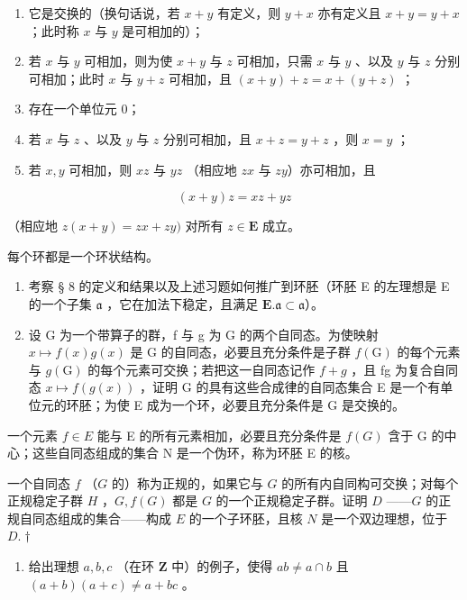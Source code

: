 \begin{enumerate}
\def\labelenumi{(\arabic{enumi})}
\item
  它是交换的（换句话说，若 \(x + y\) 有定义，则 \(y + x\) 亦有定义且 \(x + y = y + x\) ；此时称 \(x\) 与 \(y\) 是可相加的）；
\item
  若 \(x\) 与 \(y\) 可相加，则为使 \(x + y\) 与 \(z\) 可相加，只需 \(x\) 与 \(y\) 、以及 \(y\) 与 \(z\) 分别可相加；此时 \(x\) 与 \(y + z\) 可相加，且 \((x + y) + z = x + (y + z)\) ；
\item
  存在一个单位元 0；
\item
  若 \(x\) 与 \(z\) 、以及 \(y\) 与 \(z\) 分别可相加，且 \(x + z = y + z\) ，则 \(x = y\) ；
\item
  若 \(x, y\) 可相加，则 \(xz\) 与 \(yz\) （相应地 \(zx\) 与 \(zy\)）亦可相加，且
\end{enumerate}

\[
(x + y) z = x z + y z
\]

（相应地 \(z(x + y) = zx + zy)\) 对所有 \(z \in \mathbf{E}\) 成立。

每个环都是一个环状结构。

\begin{enumerate}
\def\labelenumi{(\alph{enumi})}
\item
  考察 § 8 的定义和结果以及上述习题如何推广到环胚（环胚 E 的左理想是 E 的一个子集 \(\mathfrak{a}\) ，它在加法下稳定，且满足 \(\mathbf{E}.\mathfrak{a}\subset \mathfrak{a}\)）。
\item
  设 G 为一个带算子的群，f 与 g 为 G 的两个自同态。为使映射 \(x \mapsto f(x)g(x)\) 是 G 的自同态，必要且充分条件是子群 \(f(\mathrm{G})\) 的每个元素与 \(g(\mathrm{G})\) 的每个元素可交换；若把这一自同态记作 \(f + g\) ，且 fg 为复合自同态 \(x \mapsto f(g(x))\) ，证明 G 的具有这些合成律的自同态集合 E 是一个有单位元的环胚；为使 E 成为一个环，必要且充分条件是 G 是交换的。
\end{enumerate}

一个元素 \(f \in E\) 能与 E 的所有元素相加，必要且充分条件是 \(f(G)\) 含于 G 的中心；这些自同态组成的集合 N 是一个伪环，称为环胚 E 的核。

一个自同态 \(f\) （\(G\) 的）称为正规的，如果它与 \(G\) 的所有内自同构可交换；对每个正规稳定子群 \(H\) ，\(G, f(G)\) 都是 \(G\) 的一个正规稳定子群。证明 \(D\) ——\(G\) 的正规自同态组成的集合——构成 \(E\) 的一个子环胚，且核 \(N\) 是一个双边理想，位于 \(D.†\)

\begin{enumerate}
\def\labelenumi{\arabic{enumi}.}
\setcounter{enumi}{15}
\tightlist
\item
  给出理想 \(a, b, c\) （在环 \(\mathbf{Z}\) 中）的例子，使得 \(ab \neq a \cap b\) 且 \((a + b)(a + c) \neq a + bc\) 。
\end{enumerate}

